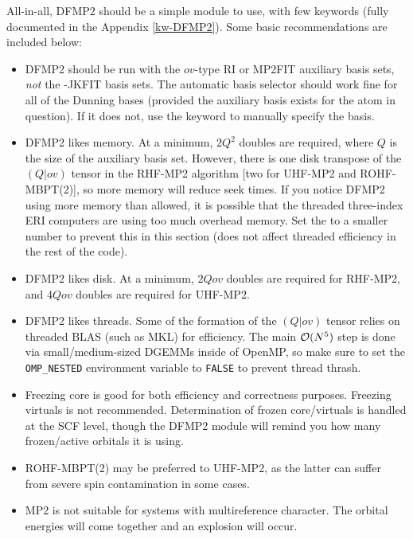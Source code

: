 All-in-all, DFMP2 should be a simple module to use, with few keywords (fully
documented in the Appendix \ref{kw-DFMP2}). Some basic recommendations are included below:
\begin{itemize}
\item DFMP2 should be run with the $ov$-type RI or MP2FIT auxiliary basis sets,
\emph{not} the -JKFIT basis sets. The automatic basis selector should work fine for
all of the Dunning bases (provided the auxiliary basis exists for the atom in
question). If it does not, use the  keyword to manually
specify the basis. 
\item DFMP2 likes memory. At a minimum, $2Q^2$ doubles are required, where $Q$ is
the size of the auxiliary basis set. However, there is one disk transpose of the
$(Q|ov)$ tensor in the RHF-MP2 algorithm [two for UHF-MP2 and ROHF-MBPT(2)], so more
memory will reduce seek times. If you notice DFMP2 using more memory than
allowed, it is possible that the threaded three-index ERI computers are using
too much overhead memory. Set the  to a smaller
number to prevent this in this section (does not affect threaded efficiency in
the rest of the code). 
\item DFMP2 likes disk. At a minimum, $2Qov$ doubles are required for RHF-MP2,
and $4Qov$ doubles are required for UHF-MP2. 
\item DFMP2 likes threads. Some of the formation of the $(Q|ov)$ tensor relies
on threaded BLAS (such as MKL) for efficiency. The main ${\cal O}(N^5)$ step is
done via small/medium-sized DGEMMs inside of OpenMP, so make sure to set the
\texttt{OMP\_NESTED} environment variable to \texttt{FALSE} to prevent thread
thrash.
\item Freezing core is good for both efficiency and correctness purposes.
Freezing virtuals is not recommended. Determination of frozen core/virtuals is
handled at the SCF level, though the DFMP2 module will remind you how many
frozen/active orbitals it is using. 
\item ROHF-MBPT(2) may be preferred to UHF-MP2, as the latter can suffer from
severe spin contamination in some cases.
\item MP2 is not suitable for systems with multireference character. The
orbital energies will come together and an explosion will occur. 
\end{itemize}  

